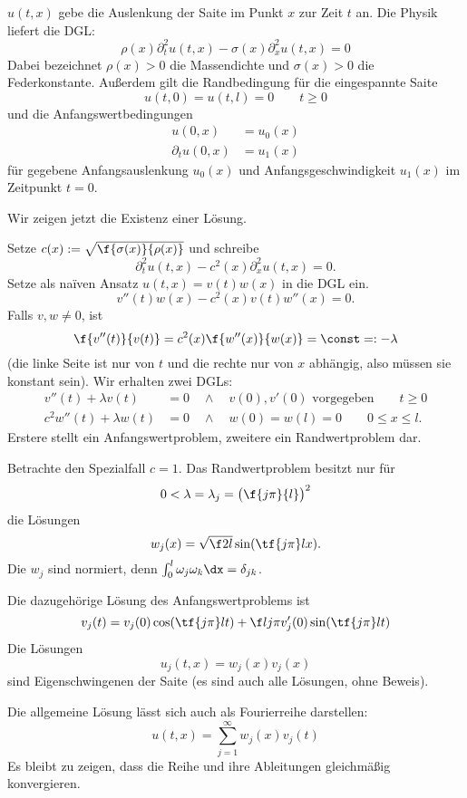 \setcounter{thm}{4} %
\begin{ex} %
	$u(t,x)$ gebe die Auslenkung der Saite im Punkt $x$ zur Zeit $t$ an. 
	Die Physik liefert die DGL:
	\[
		\rho(x) \partial_t^2 u(t,x) - \sigma(x) \partial_x^2 u(t,x) = 0
	\]
	Dabei bezeichnet $\rho(x) > 0$ die Massendichte und $\sigma(x) > 0$ die Federkonstante.
	Außerdem gilt die Randbedingung für die eingespannte Saite
	\[
		u(t,0) = u(t,l) = 0
		\qquad t \ge 0
	\]
	und die Anfangswertbedingungen
	\begin{align*}
		u(0,x) &= u_0(x) \\
		\partial_t u(0,x) &= u_1(x)
	\end{align*}
	für gegebene Anfangsauslenkung $u_0(x)$ und Anfangsgeschwindigkeit $u_1(x)$ im Zeitpunkt $t = 0$.

	Wir zeigen jetzt die Existenz einer Lösung.

	Setze $c(x) := \sqrt{\f {\sigma(x)}{\rho(x)}}$ und schreibe
	\[
		\partial_t^2 u(t,x) - c^2(x) \partial_x^2 u(t,x) = 0.
	\]
	Setze als naïven Ansatz $u(t,x) = v(t)w(x)$ in die DGL ein.
	\[
		v''(t) w(x) - c^2(x) v(t) w''(x) = 0.
	\]
	Falls $v,w \neq 0$, ist
	\[
		\f {v''(t)}{v(t)} = c^2(x) \f {w''(x)}{w(x)} = \const =: - \lambda
	\]
	(die linke Seite ist nur von $t$ und die rechte nur von $x$ abhängig, also müssen sie konstant sein).
	Wir erhalten zwei DGLs:
	\begin{align*}
		v''(t) + \lambda v(t) &= 0 \quad \land  \quad v(0), v'(0) \text{ vorgegeben} \qquad t \ge 0 \\
		c^2 w''(t) + \lambda w(t) &= 0 \quad \land \quad w(0) = w(l) = 0 \qquad 0 \le x \le l.
	\end{align*}
	Erstere stellt ein Anfangswertproblem, zweitere ein Randwertproblem dar.

	Betrachte den Spezialfall $c = 1$.
	Das Randwertproblem besitzt nur für 
	\[
		0 < \lambda = \lambda_j = \big( \f {j\pi}{l} \big)^2
	\]
	die Lösungen
	\[
		w_j(x) = \sqrt{\f 2l} \sin( \tf {j\pi}l x).
	\]
	Die $w_j$ sind normiert, denn $\int_{0}^l \omega_j \omega_k \dx = \delta_{jk}$.

	Die dazugehörige Lösung des Anfangswertproblems ist
	\[
		v_j(t) = v_j(0) \cos(\tf {j\pi}l t) + \f l{j\pi} v_j'(0) \sin(\tf{j\pi}l t)
	\]
	Die Lösungen
	\[
		u_j(t,x) = w_j(x) v_j(x)
	\]
	sind Eigenschwingenen der Saite (es sind auch alle Lösungen, ohne Beweis).
	
	Die allgemeine Lösung lässt sich auch als Fourierreihe darstellen:
	\[
		u(t,x) = \sum_{j=1}^\infty w_j(x) v_j(t)
	\]
	Es bleibt zu zeigen, dass die Reihe und ihre Ableitungen gleichmäßig konvergieren.
\end{ex}


